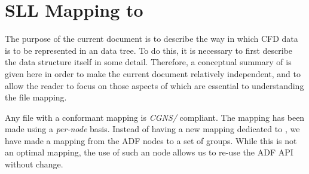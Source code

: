 %
%
%
%
%
%
%

\section{SLL Mapping to \HDF}
\label{s:summary}
\thispagestyle{plain}


The purpose of the current document is to describe the way in which
CFD data is to be represented in an \HDF data tree. To do this, it is necessary
to first describe the \HDF data structure itself in some
detail. Therefore, a conceptual summary of \HDF is given here in order
to make the current document relatively independent, and to allow
the reader to focus on those aspects of \HDF which are essential to
understanding the file mapping.

Any \HDF file with a conformant mapping is \emph{CGNS/\HDF} compliant. The
mapping has been made using a \emph{per-node} basis. Instead of having a new
mapping dedicated to \HDF, we have made a mapping from the ADF nodes
to a set of \HDF groups. While this is not an optimal mapping, the use of 
such an \HDF node allows us to re-use the ADF API without change.

